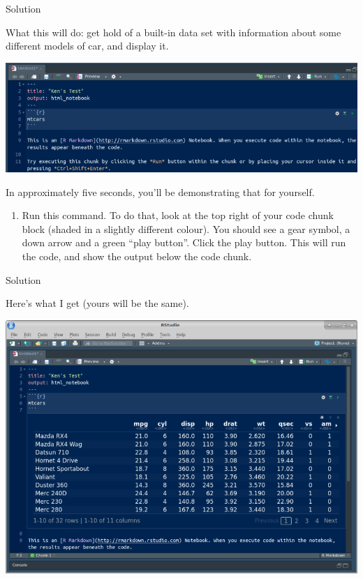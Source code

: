 \documentclass[]{tufte-book}
\providecommand{\tightlist}{%
  \setlength{\itemsep}{0pt}\setlength{\parskip}{0pt}}
\theoremstyle{definition}
\theoremstyle{definition}
\theoremstyle{definition}
\theoremstyle{remark}
\begin{document}
Solution

What this will do: get hold of a built-in data set with information
about some different models of car, and display it.

\includegraphics{chunk2.png}

In approximately five seconds, you'll be demonstrating that for
yourself.

\begin{enumerate}
\def\labelenumi{(\alph{enumi})}
\setcounter{enumi}{4}
\tightlist
\item
  Run this command. To do that, look at the top right of your code chunk
  block (shaded in a slightly different colour). You should see a gear
  symbol, a down arrow and a green ``play button''. Click the play
  button. This will run the code, and show the output below the code
  chunk.
\end{enumerate}

Solution

Here's what I get (yours will be the same).

\includegraphics{chunk3.png}
\end{document}

